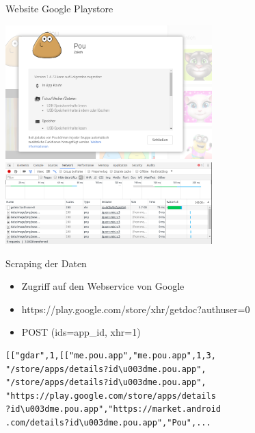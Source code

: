 \documentclass[compress,t]{beamer}
\begin{document}
\begin{frame}{Website Google Playstore}

    \begin{center}
        \includegraphics[width=0.6\textwidth]{img/google_play.png}
        \newline
        \includegraphics[width=0.6\textwidth]{img/google_play_network.png}
    \end{center}

\end{frame}

\begin{frame}[fragile]{Scraping der Daten}

    \begin{itemize}
        \item Zugriff auf den Webservice von Google
        \item https://play.google.com/store/xhr/getdoc?authuser=0
        \item POST (ids=app\_id, xhr=1)
    \end{itemize}

    \begin{lstlisting}
[["gdar",1,[["me.pou.app","me.pou.app",1,3,
"/store/apps/details?id\u003dme.pou.app",
"/store/apps/details?id\u003dme.pou.app",
"https://play.google.com/store/apps/details
?id\u003dme.pou.app","https://market.android
.com/details?id\u003dme.pou.app","Pou",...
    \end{lstlisting}

\end{frame}
\end{document}
